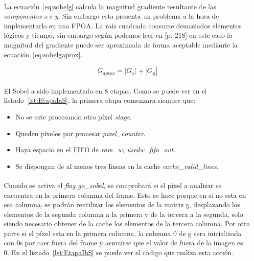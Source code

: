 \documentclass[a4paper,12pt,titlepage,final]{book}
\begin{document}
\paragraph{}
La ecuación~\ref{eq:sobelg} calcula la magnitud gradiente resultante de las \textit{componentes x} e \textit{y}. Sin embargo esta presenta un problema a la hora de implementarlo en una FPGA. La raíz cuadrada consume demasiados elementos lógicos y tiempo, sin embargo según podemos leer en [p. 218] \citet{Myler} en este caso la magnitud del gradiente puede ser aproximada de forma aceptable mediante la ecuación~\ref{eq:sobelgaprox}.

\begin{equation}\label{eq:sobelgaprox}
G_{aprox}=|G_x| + |G_y|
\end{equation}

\paragraph{}
El Sobel a sido implementado en 8 etapas. Como se puede ver en el listado~\ref{lst:EtapaIaS}, la primera etapa comenzara siempre que:

\begin{itemize}
 \item No se este procesando otro píxel \textit{stage}.
 \item Queden píxeles por procesar \textit{pixel\_counter}.
 \item Haya espacio en el FIFO de \textit{ram\_w, usedw\_fifo\_out}.
 \item Se dispongan de al menos tres líneas en la cache \textit{cache\_valid\_lines}.
\end{itemize}



\paragraph{}
Cuando se activa el \textit{flag go\_sobel}, se comprobará si el píxel a analizar se encuentra en la primera columna del frame. Esto se hace porque en si no esta en esa columna, se podrán reutilizar los elementos de la matriz g, desplazando los elementos de la segunda columna a la primera y de la tercera a la segunda, solo siendo necesario obtener de la cache los elementos de la tercera columna. Por otra parte si el píxel esta en la primera columna, la columna 0 de g sera inicializada con 0s por caer fuera del frame y asumirse que el valor de fuera de la imagen es 0. En el listado~\ref{lst:EtapaIbS} se puede ver el código que realiza esta acción.
\end{document}
